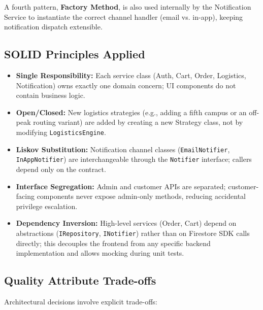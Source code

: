 \documentclass[11pt,a4paper]{article}
\begin{document}
A fourth pattern, \textbf{Factory Method}, is also used internally by the Notification Service to instantiate the correct channel handler (email vs. in-app), keeping notification dispatch extensible.

\subsection{SOLID Principles Applied}
\begin{itemize}
    \item \textbf{Single Responsibility:} Each service class (Auth, Cart, Order, Logistics, Notification) owns exactly one domain concern; UI components do not contain business logic.
    \item \textbf{Open/Closed:} New logistics strategies (e.g., adding a fifth campus or an off-peak routing variant) are added by creating a new Strategy class, not by modifying \texttt{LogisticsEngine}.
    \item \textbf{Liskov Substitution:} Notification channel classes (\texttt{EmailNotifier}, \texttt{InAppNotifier}) are interchangeable through the \texttt{Notifier} interface; callers depend only on the contract.
    \item \textbf{Interface Segregation:} Admin and customer APIs are separated; customer-facing components never expose admin-only methods, reducing accidental privilege escalation.
    \item \textbf{Dependency Inversion:} High-level services (Order, Cart) depend on abstractions (\texttt{IRepository}, \texttt{INotifier}) rather than on Firestore SDK calls directly; this decouples the frontend from any specific backend implementation and allows mocking during unit tests.
\end{itemize}

\subsection{Quality Attribute Trade-offs}
Architectural decisions involve explicit trade-offs:
\end{document}
